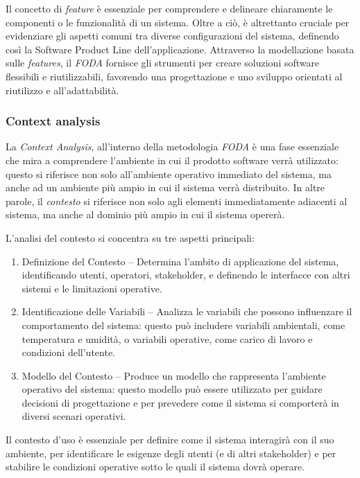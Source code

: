 \documentclass[12pt]{report}
\newcommand{\foda}{\textsl{FODA}\xspace}
\begin{document}
Il concetto di \textit{feature} è essenziale per comprendere e delineare chiaramente le componenti o le funzionalità di un sistema. Oltre a ciò, è altrettanto cruciale per evidenziare gli aspetti comuni tra diverse configurazioni del sistema, definendo così la Software Product Line dell'applicazione. Attraverso la modellazione basata sulle \textit{features}, il \foda fornisce gli strumenti per creare soluzioni software flessibili e riutilizzabili, favorendo una progettazione e uno sviluppo orientati al riutilizzo e all'adattabilità.


\subsubsection{Context analysis}
La \textit{Context Analysis}, all'interno della metodologia \foda è una fase essenziale che mira a comprendere l'ambiente in cui il prodotto software verrà utilizzato: questo si riferisce non solo all'ambiente operativo immediato del sistema, ma anche ad un ambiente più ampio in cui il sistema verrà distribuito. In altre parole, il \textit{contesto} si riferisce non solo agli elementi immediatamente adiacenti al sistema, ma anche al dominio più ampio in cui il sistema opererà.

L'analisi del contesto si concentra su tre aspetti principali:

\begin{enumerate}
\item \textsf{Definizione del Contesto} -- Determina l'ambito di applicazione del sistema, identificando utenti, operatori, stakeholder, e definendo le interfacce con altri sistemi e le limitazioni operative.
\item \textsf{Identificazione delle Variabili} -- Analizza le variabili che possono influenzare il comportamento del sistema: questo può includere variabili ambientali, come temperatura e umidità, o variabili operative, come carico di lavoro e condizioni dell'utente.
\item \textsf{Modello del Contesto} -- Produce un modello che rappresenta l'ambiente operativo del sistema: questo modello può essere utilizzato per guidare decisioni di progettazione e per prevedere come il sistema si comporterà in diversi scenari operativi.
\end{enumerate}

Il contesto d'uso è essenziale per definire come il sistema interagirà con il suo ambiente, per identificare le esigenze degli utenti (e di altri stakeholder) e per stabilire le condizioni operative sotto le quali il sistema dovrà operare.
\end{document}
